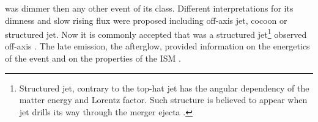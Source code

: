 \GRB{} was dimmer then any other event of its class. Different interpretations for its 
dimness and slow rising flux were proposed including off-axis jet, cocoon or structured jet. 
Now it is commonly accepted that \GRB{} was a structured jet\footnote{
    Structured jet, contrary to the top-hat jet has the angular dependency of the 
    matter energy and Lorentz factor. Such structure is believed to appear 
    when jet drills its way through the merger ejecta \citep{Lamb:2017ych}.
} observed off-axis 
\citep[\eg][]{Fong:2017ekk,Troja:2017nqp,Margutti:2018xqd,Lamb:2017ych,Lamb:2018ohw,Ryan:2019fhz,Alexander:2018dcl,Mooley:2018dlz,Ghirlanda:2018uyx}.
%
The \GRB{} late emission, the afterglow, provided information on the energetics of the 
event and on the properties of the \ac{ISM} \citep[\eg][]{Hajela:2019mjy}. 



